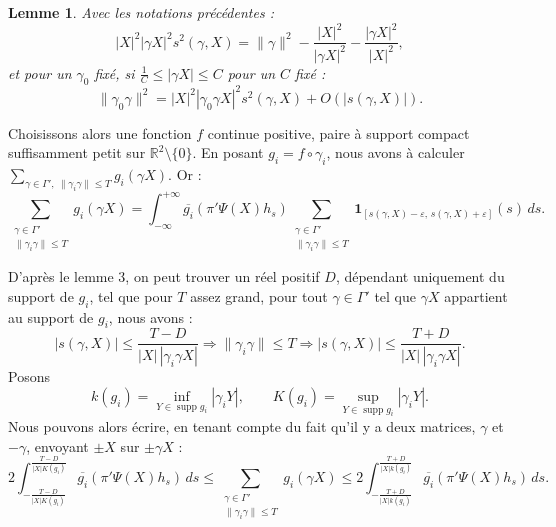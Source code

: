 \documentclass[11pt]{article}
\newtheorem{lemme}{Lemme}
\theoremstyle{remark}
\newcommand{\R}{\mathbb{R}}
\newcommand{\supp}{\operatorname{supp}}
\begin{document}
\begin{lemme}
Avec les notations précédentes :
\[
|X|^2|\gamma X|^2s^2(\gamma,X)
=\|\gamma\|^2-\frac{|X|^2}{|\gamma X|^2}-\frac{|\gamma X|^2}{|X|^2},
\]
et pour un $\gamma_0$ fixé, si $\frac1C\le |\gamma X|\le C$ pour un $C$ fixé :
\[
\|\gamma_0\gamma\|^2=|X|^2|\gamma_0\gamma X|^2s^2(\gamma,X)+O(|s(\gamma,X)|).
\]
\end{lemme}

Choisissons alors une fonction $f$ continue positive, paire à support compact suffisamment petit sur $\R^2\setminus\{0\}$. En posant $g_i=f\circ\gamma_i$, nous avons à calculer
$\sum_{\gamma\in\Gamma',\ \|\gamma_i\gamma\|\le T}g_i(\gamma X)$. Or :
\[
\sum_{\substack{\gamma\in\Gamma'\\ \|\gamma_i\gamma\|\le T}}g_i(\gamma X)
=\int_{-\infty}^{+\infty}\overline{g_i}(\pi'\Psi(X)h_s)
\sum_{\substack{\gamma\in\Gamma'\\ \|\gamma_i\gamma\|\le T}}
\mathbf 1_{[s(\gamma,X)-\varepsilon,\,s(\gamma,X)+\varepsilon]}(s)\,ds.
\]

D'après le lemme 3, on peut trouver un réel positif $D$, dépendant uniquement du support de $g_i$, tel que pour $T$ assez grand, pour tout $\gamma\in\Gamma'$ tel que $\gamma X$ appartient au support de $g_i$, nous avons :
\[
|s(\gamma,X)|\le\frac{T-D}{|X|\,|\gamma_i\gamma X|}
\Longrightarrow \|\gamma_i\gamma\|\le T
\Longrightarrow
|s(\gamma,X)|\le\frac{T+D}{|X|\,|\gamma_i\gamma X|}.
\]
Posons
\[
k(g_i)=\inf_{Y\in\supp g_i}|\gamma_iY|,
\qquad
K(g_i)=\sup_{Y\in\supp g_i}|\gamma_iY|.
\]
Nous pouvons alors écrire, en tenant compte du fait qu'il y a deux matrices, $\gamma$ et $-\gamma$, envoyant $\pm X$ sur $\pm\gamma X$ :
\[
2\int_{-\frac{T-D}{|X|K(g_i)}}^{\frac{T-D}{|X|K(g_i)}}
\overline{g_i}(\pi'\Psi(X)h_s)\,ds
\le
\sum_{\substack{\gamma\in\Gamma'\\ \|\gamma_i\gamma\|\le T}}g_i(\gamma X)
\le
2\int_{-\frac{T+D}{|X|k(g_i)}}^{\frac{T+D}{|X|k(g_i)}}
\overline{g_i}(\pi'\Psi(X)h_s)\,ds.
\]
\end{document}
